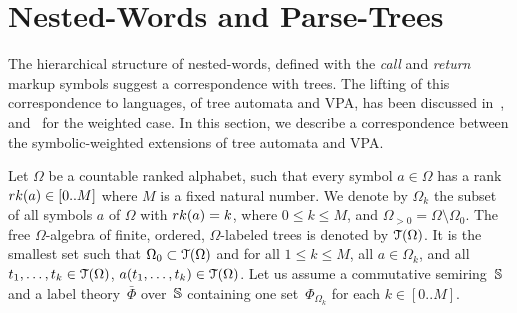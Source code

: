 




\newpage
\appendix



\section{Nested-Words and Parse-Trees}
\label{sec:trees}
The hierarchical structure of nested-words, defined with the \emph{call} and \emph{return} markup symbols
suggest a correspondence with trees.
The lifting of this correspondence to languages, of tree automata and VPA,
has been discussed in~\cite{AlurMadhusudan09nested},
and~\cite{Caralp12VPAmult} for the weighted case.
In this section, we describe a correspondence between the symbolic-weighted extensions
of tree automata and VPA.

Let $\Omega$ be a countable ranked alphabet, such that
every symbol $a \in \Omega$ has a rank
$\rank(a) \in [0..M]$ where $M$ is a fixed natural number.
We denote by $\Omega_k$ the subset of all symbols $a$ of $\Omega$
with $\rank(a) = k$, where $0 \leq k \leq M$,
and $\Omega_{>0} = \Omega \setminus \Omega_0$.
%
\noindent
The free $\Omega$-algebra of finite, ordered,
$\Omega$-labeled trees is denoted by $\mathcal{T}(\Omega)$.
It is the smallest set such that  $\Omega_0 \subset \mathcal{T}(\Omega)$
and for all $1 \leq k \leq M$, all $a \in \Omega_k$,
and all $t_1, \ldots, t_k \in \mathcal{T}(\Omega)$, $a(t_1, \ldots, t_k) \in \mathcal{T}(\Omega)$.
%
%
Let us assume a commutative semiring~$\mathbb{S}$
and a label theory~$\bar{\Phi}$ over~$\mathbb{S}$
containing one set~$\Phi_{\Omega_k}$ for each $k \in [0..M]$.
%
\renewcommand{\call}[1]{\ensuremath \langle_{#1}}
\renewcommand{\return}[1]{\ensuremath {}_{#1}{\rangle}} %

